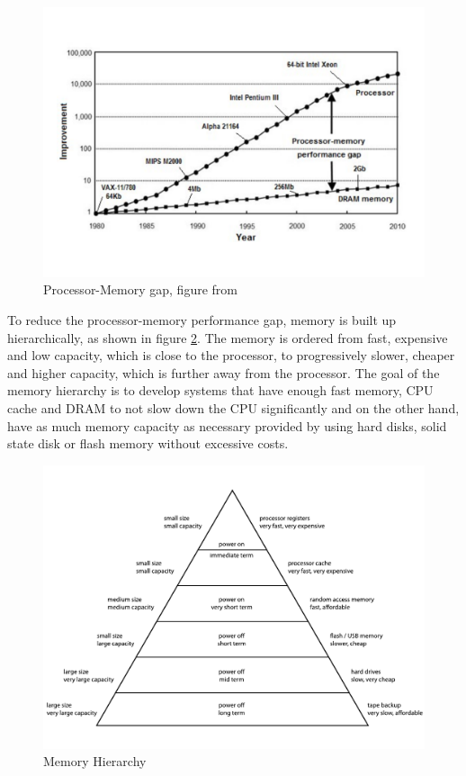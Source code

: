 \documentclass[
	12pt,
	a4paper,
	abstract,
	bibliography=totoc,
	chapterprefix,
	headings=openright,
	numbers=endperiod,
	parskip=half,
	twoside,
]{scrreprt}
\begin{document}
\begin{figure}[ht]
	\centering
	\includegraphics[scale=0.5]{processor_memory_gap.pdf}
	\caption{Processor-Memory gap, figure from \cite{cpu-mem-gap}}
		\label{fig:processor memory gap}
\end{figure}

To reduce the processor-memory performance gap, memory is built up hierarchically, as shown in figure \ref{fig:memory hierarchy}.
The memory is ordered from fast, expensive and low capacity, which is close to the processor, to progressively slower, cheaper and higher capacity, which is further away from the processor.
The goal of the memory hierarchy is to develop systems that have enough fast memory, CPU cache and DRAM to not slow down the CPU significantly and on the other hand, have as much memory capacity as necessary provided by using hard disks, solid state disk or flash memory without excessive costs.

\newpage

\begin{figure}[ht]
	\centering
	\includegraphics[scale=0.6]{ComputerMemoryHierarchy.pdf}
	\caption{Memory Hierarchy}
		\label{fig:memory hierarchy}
\end{figure}
\end{document}
